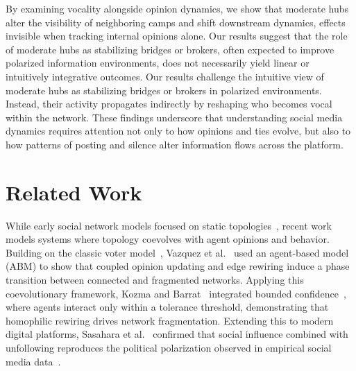 \documentclass{svproc}
\begin{document}
By examining vocality alongside opinion dynamics, we show that
moderate hubs alter the visibility of neighboring camps and shift
downstream dynamics, effects invisible when tracking internal opinions
alone.
Our results suggest that the role of moderate hubs as stabilizing
bridges or brokers, often expected to improve polarized information
environments, does not necessarily yield linear or intuitively
integrative outcomes. Our results challenge the intuitive view of
moderate hubs as stabilizing bridges or brokers in polarized
environments. Instead, their activity propagates indirectly by
reshaping who becomes vocal within the network. These findings
underscore that understanding social media dynamics requires attention
not only to how opinions and ties evolve, but also to how patterns of
posting and silence alter information flows across the platform.
\par

\section{Related Work}\label{sec:related}
While early social network models focused on static
topologies~\cite{watts1998}, recent work models systems where topology
coevolves with agent opinions and behavior. Building on the classic
voter model~\cite{clifford1973}, Vazquez et al.~\cite{vazquez2008}
used an agent-based model (ABM) to show that coupled opinion updating
and edge rewiring induce a phase transition between connected and
fragmented networks. Applying this coevolutionary framework, Kozma and
Barrat~\cite{kozma2008} integrated bounded
confidence~\cite{deffuant2000,hegselmann2002}, where agents interact
only within a tolerance threshold, demonstrating that homophilic
rewiring drives network fragmentation. Extending this to modern
digital platforms, Sasahara et al.~\cite{sasahara2020} confirmed that
social influence combined with unfollowing reproduces the political
polarization observed in empirical social media
data~\cite{conover2011}.
\par
\end{document}
